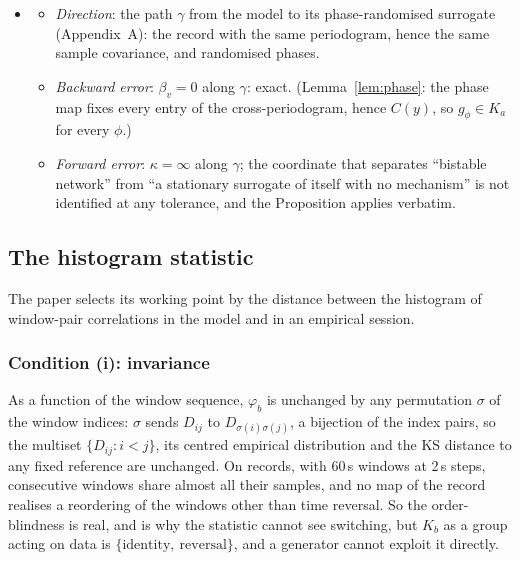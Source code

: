 \documentclass[11pt]{article}
\begin{document}
\begin{itemize}
\begin{itemize}
  \item \emph{Forward error}: $\kappa$ large along $r$; the regime, and the linear-against-nonlinear distinction with it, is not identified by $\varphi_a$ at the field's own criteria.
  \end{itemize}
\item[$\Theta_3$]
  \begin{itemize}
  \item \emph{Direction}: the path $\gamma$ from the model to its phase-randomised surrogate (Appendix~A): the record with the same periodogram, hence the same sample covariance, and randomised phases.
  \item \emph{Backward error}: $\beta_v=0$ along $\gamma$: exact. (Lemma~\ref{lem:phase}: the phase map fixes every entry of the cross-periodogram, hence $C(y)$, so $g_\phi\in K_a$ for every $\phi$.)
  \item \emph{Forward error}: $\kappa=\infty$ along $\gamma$; the coordinate that separates ``bistable network'' from ``a stationary surrogate of itself with no mechanism'' is not identified at any tolerance, and the Proposition applies verbatim.
  \end{itemize}
\end{itemize}

\subsection{The histogram statistic}
The paper selects its working point by the distance between the histogram of window-pair correlations in the model and in an empirical session.
\subsubsection{Condition (i): invariance}
As a function of the window sequence, $\varphi_b$ is unchanged by any permutation $\sigma$ of the window indices: $\sigma$ sends $D_{ij}$ to $D_{\sigma(i)\sigma(j)}$, a bijection of the index pairs, so the multiset $\{D_{ij}: i<j\}$, its centred empirical distribution and the KS distance to any fixed reference are unchanged. On records, with 60\,s windows at 2\,s steps, consecutive windows share almost all their samples, and no map of the record realises a reordering of the windows other than time reversal. So the order-blindness is real, and is why the statistic cannot see switching, but $K_b$ as a group acting on data is $\{\text{identity},\ \text{reversal}\}$, and a generator cannot exploit it directly.
\end{document}
